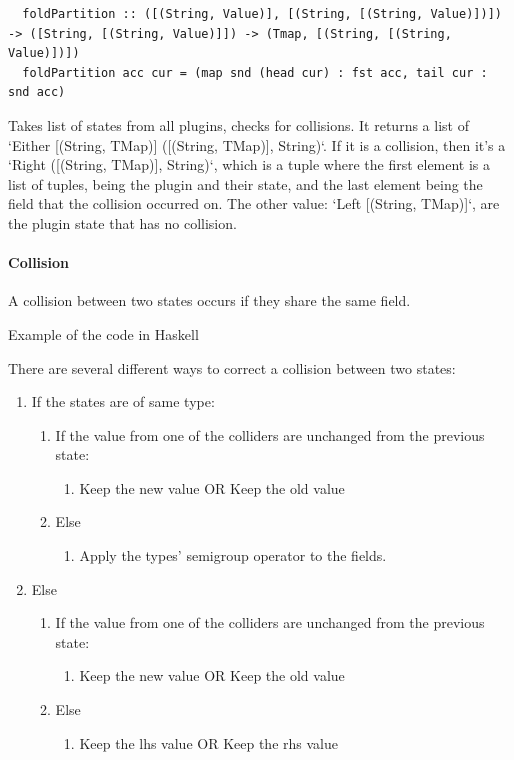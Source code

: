 \begin{verbatim}
  foldPartition :: ([(String, Value)], [(String, [(String, Value)])]) -> ([String, [(String, Value)]]) -> (Tmap, [(String, [(String, Value)])])
  foldPartition acc cur = (map snd (head cur) : fst acc, tail cur : snd acc)
\end{verbatim}

Takes list of states from all plugins, checks for collisions. It returns a
list of `Either [(String, TMap)] ([(String, TMap)], String)`. If it is a
collision, then it's a `Right ([(String, TMap)], String)`, which is a tuple
where the first element is a list of tuples, being the plugin and their
state, and the last element being the field that the collision occurred on.
The other value: `Left [(String, TMap)]`, are the plugin state that has no
collision.

\paragraph{Collision} A collision between two states occurs if they share the same
field.

Example of the code in Haskell



There are several different ways to correct a collision between two
states:

\begin{enumerate}
  \item If the states are of same type:
    \begin{enumerate}
      \item If the value from one of the colliders are unchanged from the previous state:
        \begin{enumerate}
          \item Keep the new value OR Keep the old value
        \end{enumerate}
      \item Else
        \begin{enumerate}
          \item Apply the types' semigroup operator to the fields.
        \end{enumerate}
    \end{enumerate}
  \item Else
    \begin{enumerate}
      \item If the value from one of the colliders are unchanged from the previous state:
        \begin{enumerate}
          \item Keep the new value OR Keep the old value
        \end{enumerate}
      \item Else
        \begin{enumerate}
          \item Keep the lhs value OR Keep the rhs value
        \end{enumerate}
    \end{enumerate}
\end{enumerate}

